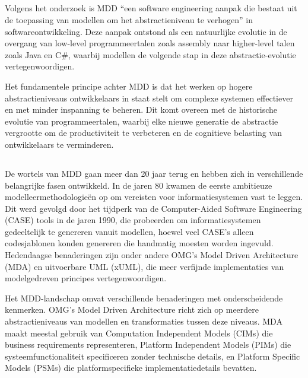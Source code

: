 \subsection{}%

Volgens het onderzoek \textcite{Hailpern2006} is MDD “een software engineering aanpak die bestaat uit de toepassing van modellen om het abstractieniveau te verhogen” in softwareontwikkeling. Deze aanpak ontstond als een natuurlijke evolutie in de overgang van low-level programmeertalen zoals assembly naar higher-level talen zoals Java en C\#, waarbij modellen de volgende stap in deze abstractie-evolutie vertegenwoordigen.

Het fundamentele principe achter MDD is dat het werken op hogere abstractieniveaus ontwikkelaars in staat stelt om complexe systemen effectiever en met minder inspanning te beheren. Dit komt overeen met de historische evolutie van programmeertalen, waarbij elke nieuwe generatie de abstractie vergrootte om de productiviteit te verbeteren en de cognitieve belasting van ontwikkelaars te verminderen.


\subsection{}%
De wortels van MDD gaan meer dan 20 jaar terug en hebben zich in verschillende belangrijke fasen ontwikkeld. In de jaren 80 kwamen de eerste ambitieuze modelleermethodologieën op om vereisten voor informatiesystemen vast te leggen. Dit werd gevolgd door het tijdperk van de Computer-Aided Software Engineering (CASE) tools in de jaren 1990, die probeerden om informatiesystemen gedeeltelijk te genereren vanuit modellen, hoewel veel CASE's alleen codesjablonen konden genereren die handmatig moesten worden ingevuld. Hedendaagse benaderingen zijn onder andere OMG's Model Driven Architecture (MDA) en uitvoerbare UML (xUML), die meer verfijnde implementaties van modelgedreven principes vertegenwoordigen.

Het MDD-landschap omvat verschillende benaderingen met onderscheidende kenmerken. OMG's Model Driven Architecture richt zich op meerdere abstractieniveaus van modellen en transformaties tussen deze niveaus. MDA maakt meestal gebruik van Computation Independent Models (CIMs) die business requirements representeren, Platform Independent Models (PIMs) die systeemfunctionaliteit specificeren zonder technische details, en Platform Specific Models (PSMs) die platformspecifieke implementatiedetails bevatten.

